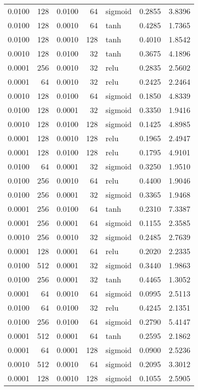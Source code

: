 \begin{table}
\begin{tabular}{rrrrlrr}
0.0100 & 128 & 0.0100 & 64 & sigmoid & 0.2855 & 3.8396 \\
0.0100 & 128 & 0.0010 & 64 & tanh & 0.4285 & 1.7365 \\
0.0100 & 128 & 0.0010 & 128 & tanh & 0.4010 & 1.8542 \\
0.0010 & 128 & 0.0100 & 32 & tanh & 0.3675 & 4.1896 \\
0.0001 & 256 & 0.0010 & 32 & relu & 0.2835 & 2.5602 \\
0.0001 & 64 & 0.0010 & 32 & relu & 0.2425 & 2.2464 \\
0.0010 & 128 & 0.0100 & 64 & sigmoid & 0.1850 & 4.8339 \\
0.0100 & 128 & 0.0001 & 32 & sigmoid & 0.3350 & 1.9416 \\
0.0010 & 128 & 0.0100 & 128 & sigmoid & 0.1425 & 4.8985 \\
0.0001 & 128 & 0.0010 & 128 & relu & 0.1965 & 2.4947 \\
0.0001 & 128 & 0.0100 & 128 & relu & 0.1795 & 4.9101 \\
0.0100 & 64 & 0.0001 & 32 & sigmoid & 0.3250 & 1.9510 \\
0.0100 & 256 & 0.0010 & 64 & relu & 0.4400 & 1.9046 \\
0.0100 & 256 & 0.0001 & 32 & sigmoid & 0.3365 & 1.9468 \\
0.0001 & 256 & 0.0100 & 64 & tanh & 0.2310 & 7.3387 \\
0.0001 & 256 & 0.0001 & 64 & sigmoid & 0.1155 & 2.3585 \\
0.0010 & 256 & 0.0010 & 32 & sigmoid & 0.2485 & 2.7639 \\
0.0001 & 128 & 0.0001 & 64 & relu & 0.2020 & 2.2335 \\
0.0100 & 512 & 0.0001 & 32 & sigmoid & 0.3440 & 1.9863 \\
0.0100 & 256 & 0.0001 & 32 & tanh & 0.4465 & 1.3052 \\
0.0001 & 64 & 0.0010 & 64 & sigmoid & 0.0995 & 2.5113 \\
0.0100 & 64 & 0.0100 & 32 & relu & 0.4245 & 2.1351 \\
0.0100 & 256 & 0.0100 & 64 & sigmoid & 0.2790 & 5.4147 \\
0.0001 & 512 & 0.0001 & 64 & tanh & 0.2595 & 2.1862 \\
0.0001 & 64 & 0.0001 & 128 & sigmoid & 0.0900 & 2.5236 \\
0.0010 & 512 & 0.0010 & 64 & sigmoid & 0.2095 & 3.3012 \\
0.0001 & 128 & 0.0010 & 128 & sigmoid & 0.1055 & 2.5905 \\

\end{tabular}
\end{table}
